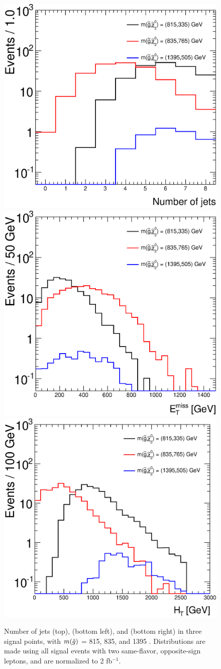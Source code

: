\begin{figure}[!htb]
\centering
\includegraphics[width=.48\textwidth]{figures/signalacceptcontam/njets_R.eps}\\
\includegraphics[width=.48\textwidth]{figures/signalacceptcontam/met_R.eps}
\includegraphics[width=.48\textwidth]{figures/signalacceptcontam/ht_R.eps}\\
\caption{
Number of jets (top), \HT (bottom left), and \met (bottom right) in three signal points, with $m({\tilde g})$ = 815, 835, and 1395 \gev. Distributions are made using all signal events with two same-flavor, opposite-sign leptons, and are normalized to 2 fb$^{-1}$. 
\label{fig:sig_njets}
}
\end{figure}

